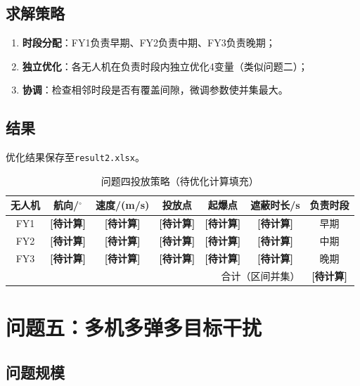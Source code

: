\documentclass[a4paper]{ctexart}
\begin{document}
\subsection{求解策略}

\begin{enumerate}[label=（\arabic*）]
  \item \textbf{时段分配}：FY1负责早期、FY2负责中期、FY3负责晚期；
  \item \textbf{独立优化}：各无人机在负责时段内独立优化4变量（类似问题二）；
  \item \textbf{协调}：检查相邻时段是否有覆盖间隙，微调参数使并集最大。
\end{enumerate}

\subsection{结果}

优化结果保存至\texttt{result2.xlsx}。

\begin{table}[H]
\centering
{}
\caption{问题四投放策略（待优化计算填充）}
\label{tab:q4_result}
\begin{tabular}{c|c|c|c|c|c|c}
\toprule
无人机 & 航向/$^\circ$ & 速度/(m/s) & 投放点 & 起爆点 & 遮蔽时长/s & 负责时段 \\
\midrule
FY1 & \textbf{[待计算]} & \textbf{[待计算]} & \textbf{[待计算]} & \textbf{[待计算]} & \textbf{[待计算]} & 早期 \\
FY2 & \textbf{[待计算]} & \textbf{[待计算]} & \textbf{[待计算]} & \textbf{[待计算]} & \textbf{[待计算]} & 中期 \\
FY3 & \textbf{[待计算]} & \textbf{[待计算]} & \textbf{[待计算]} & \textbf{[待计算]} & \textbf{[待计算]} & 晚期 \\
\midrule
\multicolumn{6}{r|}{合计（区间并集）} & \textbf{[待计算]} \\
\bottomrule
\end{tabular}
\end{table}

\section{问题五：多机多弹多目标干扰}

\subsection{问题规模}
\end{document}
